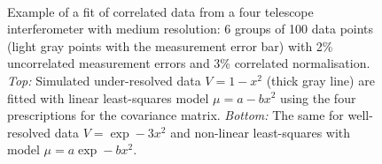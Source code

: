 \documentclass[a4paper,fleqn,usenatbib]{mnras}
\def\data{\ensuremath{{\scriptstyle V}}}
\def\mod{\ensuremath{\mu}}
\begin{document}
\begin{figure}
\centering
{}\\
\caption{Example of a fit of correlated data from a four telescope interferometer with medium resolution: 6 groups of 100 data points (light gray points with the measurement error bar) with 2\% uncorrelated measurement errors and 3\% correlated normalisation.  \emph{Top:} Simulated under-resolved data $\data = 1-x^2$ (thick gray line) are fitted with linear least-squares model $\mod = a-bx^2$ using the four prescriptions for the covariance matrix. \emph{Bottom:} The same for well-resolved data $\data = \exp -3x^2$ and non-linear least-squares with model $\mod = a\exp -bx^2$.}
\end{figure}
\end{document}
